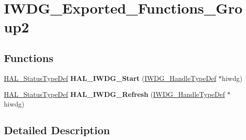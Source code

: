 \hypertarget{group___i_w_d_g___exported___functions___group2}{\section{I\-W\-D\-G\-\_\-\-Exported\-\_\-\-Functions\-\_\-\-Group2}
\label{group___i_w_d_g___exported___functions___group2}
}
\subsection*{Functions}
\begin{DoxyCompactItemize}
\item 
\hypertarget{group___i_w_d_g___exported___functions___group2_gaaa540681b7a6a4f7cc6b0b5497e6de46}{\hyperlink{stm32l1xx__hal__def_8h_a63c0679d1cb8b8c684fbb0632743478f}{H\-A\-L\-\_\-\-Status\-Type\-Def} {\bfseries H\-A\-L\-\_\-\-I\-W\-D\-G\-\_\-\-Start} (\hyperlink{struct_i_w_d_g___handle_type_def}{I\-W\-D\-G\-\_\-\-Handle\-Type\-Def} $\ast$hiwdg)}\label{group___i_w_d_g___exported___functions___group2_gaaa540681b7a6a4f7cc6b0b5497e6de46}

\item 
\hypertarget{group___i_w_d_g___exported___functions___group2_ga7e86236aea6d2f3638397fdf90333e4a}{\hyperlink{stm32l1xx__hal__def_8h_a63c0679d1cb8b8c684fbb0632743478f}{H\-A\-L\-\_\-\-Status\-Type\-Def} {\bfseries H\-A\-L\-\_\-\-I\-W\-D\-G\-\_\-\-Refresh} (\hyperlink{struct_i_w_d_g___handle_type_def}{I\-W\-D\-G\-\_\-\-Handle\-Type\-Def} $\ast$hiwdg)}\label{group___i_w_d_g___exported___functions___group2_ga7e86236aea6d2f3638397fdf90333e4a}

\end{DoxyCompactItemize}


\subsection{Detailed Description}
